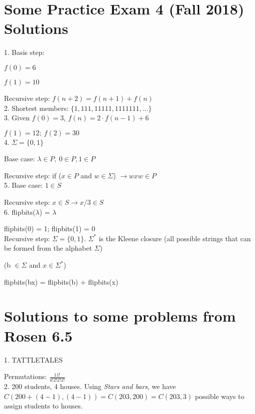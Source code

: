 \documentclass[english,openany]{book}
\begin{document}
    \section{Some Practice Exam 4 (Fall 2018) Solutions}

    1. Basis step:

    $f(0) = 6$

    $f(1) = 10$

    Recursive step: $f(n+2) = f(n+1) + f(n)$\\

    2. Shortest members: $\{1,111,11111,1111111,...\}$\\

    3. Given $f(0) = 3$, $f(n) = 2 \cdot f(n-1) + 6$

    $f(1) = 12;\ f(2) = 30$\\

    4. $\Sigma = \{0,1\}$

    Base case: $\lambda \in P,\ 0 \in P, 1 \in P$

    Recursive step: if ($x \in P$ and $w \in \Sigma$) $\rightarrow wxw \in P$\\

    5. Base case: $1 \in S$

    Recursive step: $x \in S \rightarrow x/3 \in S$\\

    6. flipbits($\lambda$) = $\lambda$

    flipbits(0) = 1; flipbits(1) = 0\\

    Recursive step: $\Sigma = \{0,1\}$. $\Sigma^*$ is the Kleene closure (all possible strings that can be formed from the alphabet $\Sigma$)

    (b $\in \Sigma$ and $x \in \Sigma^*$)

    flipbits(bx) = flipbits(b) + flipbits(x)\\

    \section{Solutions to some problems from Rosen 6.5}

    1. TATTLETALES

    Permutations: $\frac{11!}{4!2!2!2!}$\\

    2. 200 students, 4 houses. Using \textit{Stars and bars}, we have $C(200+(4-1), (4-1)) = C(203, 200) = C(203, 3)$ possible ways to assign students to houses.\\
\end{document}
